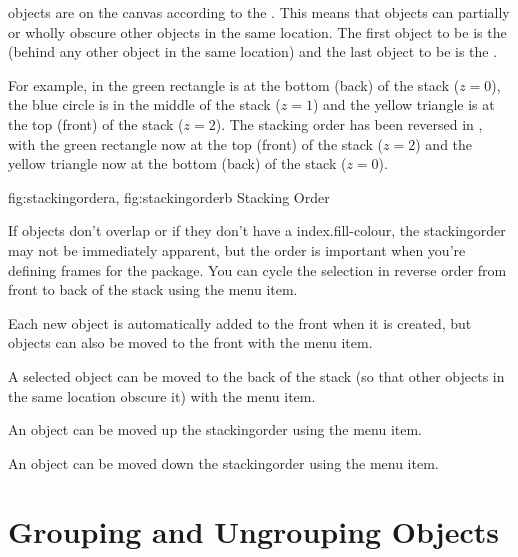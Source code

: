 \Glspl{object} are  on the
\gls{canvas} according to the
. This means that objects can
partially or wholly obscure other objects in the same location.
The first object to be 
is the  (behind any other object in the same
location) and the last object to be 
is the .

For example, in  the green rectangle is
at the bottom (\gls{back}) of the stack ($z=0$), the blue circle is in
the middle of the stack ($z=1$) and the yellow triangle is at the
top (\gls{front}) of the stack ($z=2$). The stacking order has
been reversed in , with the green
rectangle now at the top (front) of the stack ($z=2$) and
the yellow triangle now at the bottom (back) of the stack
($z=0$).

{
  {fig:stackingordera}{}{},
  {fig:stackingorderb}{}{}
}
{Stacking Order}

If \glspl{object} don't overlap or if they don't have a
\gls{index.fill-colour}, the \gls{stackingorder} may not be
immediately apparent, but the order is important when you're
defining frames for the  package. You can cycle the
selection in reverse order from front to back of the stack using the
 menu item.


Each new \gls{object} is automatically added to the \gls{front} when it is
created, but \glspl{object} can also be moved to the \gls{front} 
with the  menu item.


A selected \gls{object} can be moved to the
\gls{back} of the \gls{stack} (so that other \glspl{object} in the
same location obscure it) with the  menu item.


An object can be moved up the \gls{stackingorder} using
the  menu item.


An object can be moved down the \gls{stackingorder} using
the  menu item.


\section{Grouping and Ungrouping Objects}\label{sec:grouping}

